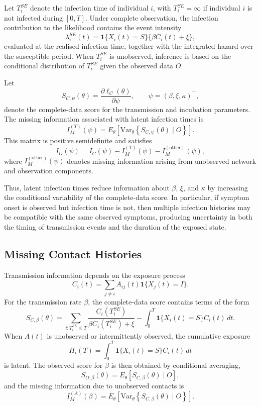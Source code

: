 \documentclass[10pt]{article}
\begin{document}
Let $T_i^{SE}$ denote the infection time of individual $i$, with $T_i^{SE}=\infty$ if individual $i$ is not infected during $[0,T]$. Under complete observation, the infection contribution to the likelihood contains the event intensity
\[
\lambda_i^{SE}(t)
=
\mathbf{1}\{X_i(t)=S\}
\{\beta C_i(t)+\xi\},
\]
evaluated at the realised infection time, together with the integrated hazard over the susceptible period. When $T_i^{SE}$ is unobserved, inference is based on the conditional distribution of $T_i^{SE}$ given the observed data $O$.

Let
\[
S_{C,\psi}(\theta)
=
\frac{\partial \ell_C(\theta)}{\partial \psi},
\qquad
\psi=(\beta,\xi,\kappa)^\top ,
\]
denote the complete-data score for the transmission and incubation parameters. The missing information associated with latent infection times is
\[
I_M^{(T)}(\psi)
=
E_\theta\left[
\mathrm{Var}_\theta
\left\{
S_{C,\psi}(\theta)
\mid O
\right\}
\right].
\]
This matrix is positive semidefinite and satisfies
\[
I_O(\psi)
=
I_C(\psi)-I_M^{(T)}(\psi)-I_M^{(\mathrm{other})}(\psi),
\]
where $I_M^{(\mathrm{other})}(\psi)$ denotes missing information arising from unobserved network and observation components.

Thus, latent infection times reduce information about $\beta$, $\xi$, and $\kappa$ by increasing the conditional variability of the complete-data score. In particular, if symptom onset is observed but infection time is not, then multiple infection histories may be compatible with the same observed symptoms, producing uncertainty in both the timing of transmission events and the duration of the exposed state.

\subsection{Missing Contact Histories}

Transmission information depends on the exposure process
\[
C_i(t)
=
\sum_{j\neq i}
A_{ij}(t)\mathbf{1}\{X_j(t)=I\}.
\]
For the transmission rate $\beta$, the complete-data score contains terms of the form
\[
S_{C,\beta}(\theta)
=
\sum_{i:T_i^{SE}\le T}
\frac{C_i(T_i^{SE})}
{\beta C_i(T_i^{SE})+\xi}
-
\int_0^T
\mathbf{1}\{X_i(t)=S\}
C_i(t)\,dt .
\]
When $A(t)$ is unobserved or intermittently observed, the cumulative exposure
\[
H_i(T)
=
\int_0^T
\mathbf{1}\{X_i(t)=S\}C_i(t)\,dt
\]
is latent. The observed score for $\beta$ is then obtained by conditional averaging,
\[
S_{O,\beta}(\theta)
=
E_\theta
\left[
S_{C,\beta}(\theta)
\mid O
\right],
\]
and the missing information due to unobserved contacts is
\[
I_M^{(A)}(\beta)
=
E_\theta
\left[
\mathrm{Var}_\theta
\left\{
S_{C,\beta}(\theta)
\mid O
\right\}
\right].
\]
\end{document}
